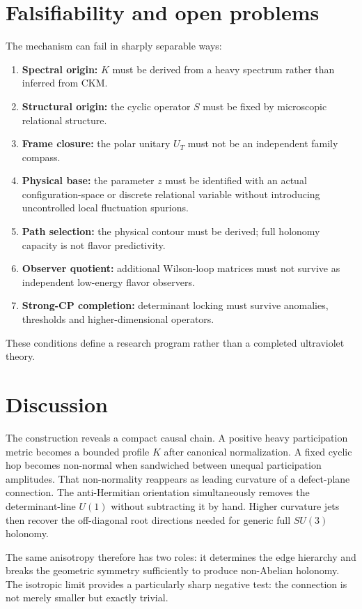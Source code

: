 \documentclass[11pt]{article}
\theoremstyle{remark}\newtheorem{remark}{Remark}
\begin{document}
\section{Falsifiability and open problems}
The mechanism can fail in sharply separable ways:
\begin{enumerate}[leftmargin=*]
\item \textbf{Spectral origin:} $K$ must be derived from a heavy spectrum rather than inferred from CKM.
\item \textbf{Structural origin:} the cyclic operator $S$ must be fixed by microscopic relational structure.
\item \textbf{Frame closure:} the polar unitary $U_T$ must not be an independent family compass.
\item \textbf{Physical base:} the parameter $z$ must be identified with an actual configuration-space or discrete relational variable without introducing uncontrolled local fluctuation spurions.
\item \textbf{Path selection:} the physical contour must be derived; full holonomy capacity is not flavor predictivity.
\item \textbf{Observer quotient:} additional Wilson-loop matrices must not survive as independent low-energy flavor observers.
\item \textbf{Strong-CP completion:} determinant locking must survive anomalies, thresholds and higher-dimensional operators.
\end{enumerate}
These conditions define a research program rather than a completed ultraviolet theory.

\section{Discussion}
The construction reveals a compact causal chain. A positive heavy participation metric becomes a bounded profile $K$ after canonical normalization. A fixed cyclic hop becomes non-normal when sandwiched between unequal participation amplitudes. That non-normality reappears as leading curvature of a defect-plane connection. The anti-Hermitian orientation simultaneously removes the determinant-line $U(1)$ without subtracting it by hand. Higher curvature jets then recover the off-diagonal root directions needed for generic full $SU(3)$ holonomy.

The same anisotropy therefore has two roles: it determines the edge hierarchy and breaks the geometric symmetry sufficiently to produce non-Abelian holonomy. The isotropic limit provides a particularly sharp negative test: the connection is not merely smaller but exactly trivial.
\end{document}
